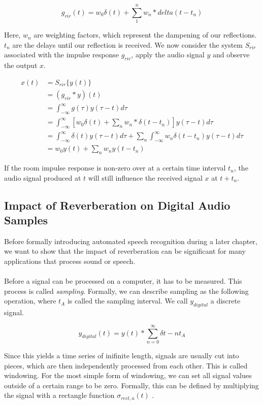 \[
g_{rir}(t) = w_0 \delta(t) + \sum_{1}^{n} w_n * delta(t - t_n)
\]

Here, $w_n$ are weighting factors, which represent the dampening of our reflections. $t_n$ are the delays until our reflection is received. We now consider the system $S_{rir}$ associated with the impulse response $g_{rir}$, apply the audio signal $y$ and observe the output $x$.

\begin{align*}
x(t) &= S_{rir}\{y(t)\} \\
     &= (g_{rir} * y)(t) \\
     &= \int_{-\infty}^{\infty} g(\tau)y(\tau - t) d\tau \\
     &= \int_{-\infty}^{\infty} \left[ w_0 \delta(t) + \sum_{n} w_n * \delta(t - t_n)\right] y(\tau - t) d\tau \\
     &= \int_{-\infty}^{\infty} \delta(t) y(\tau - t) d\tau + \sum_{n}  \int_{-\infty}^{\infty} w_n \delta(t - t_n) y(\tau - t) d\tau  \\
     &= w_0 y(t) + \sum_{n} w_n y(t - t_n)
\end{align*}

If the room impulse response is non-zero over at a certain time interval $t_n$, the audio signal produced at $t$ will still influence the received signal $x$ at $t + t_n$. 

\subsection{Impact of Reverberation on Digital Audio Samples}

Before formally introducing automated speech recognition during a later chapter, we want to show that the impact of reverberation can be significant for many applications that process sound or speech.\\ \\
Before a signal can be processed on a computer, it has to be measured. This process is called \textit{sampling}. Formally, we can describe sampling as the following operation, where $t_A$ is called the sampling interval. We call $y_{digital}$ a discrete signal. 

\[
y_{digital}(t) = y(t) * \sum_{n = 0}^{\infty} \delta{t - nt_A} 
\]

Since this yields a time series of inifinite length, signals are usually cut into pieces, which are then independently processed from each other. This is called windowing. For the most simple form of windowing, we can set all signal values outside of a certain range to be zero. Formally, this can be defined by multiplying the signal with a rectangle function $\sigma_{rect,a}(t)$ .

